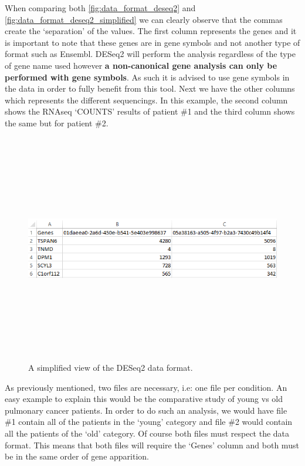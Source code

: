 \documentclass[11pt]{article}
\begin{document}
When comparing both \autoref{fig:data_format_deseq2} and \autoref{fig:data_format_deseq2_simplified} we can clearly observe that the commas create the `separation' of the values. 
The first column represents the genes and it is important to note that these genes are in gene symbols and not another type of format such as Ensembl. \acrshort{DESeq2} will perform the analysis regardless of the type of gene name used however \textbf{a non-canonical gene analysis can only be performed with gene symbols}. As such it is advised to use gene symbols in the data in order to fully benefit from this tool. Next we have the other columns which represents the different sequencings. In this example, the second column shows the RNAseq `COUNTS' results of patient \#1 and the third column shows the same but for patient \#2.
\begin{figure}[h!]
\centering
\includegraphics[width=15cm,height=10cm,keepaspectratio]{dese2_excel_data_format.png}
\caption{A simplified view of the \acrshort{DESeq2} data format.}
\label{fig:data_format_deseq2_simplified}
\end{figure}

As previously mentioned, two files are necessary, i.e: one file per condition. An easy example to explain this would be the comparative study of young vs old pulmonary cancer patients. In order to do such an analysis, we would have file \#1 contain all of the patients in the `young' category and file \#2 would contain all the patients of the `old' category. Of course both files must respect the data format. This means that both files will require the `Genes' column and both must be in the same order of gene apparition.
\end{document}
